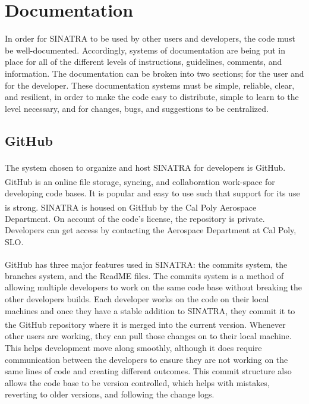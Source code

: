 \section{Documentation}
In order for SINATRA to be used by other users and developers, the code must be well-documented. Accordingly, systems of documentation are being put in place for all of the different levels of instructions, guidelines, comments, and information. The documentation  can be broken into two sections; for the user and for the developer. These documentation systems must be simple, reliable, clear, and resilient, in order to make the code easy to distribute, simple to learn to the level necessary, and for changes, bugs, and suggestions to be centralized.

\subsection{GitHub}
The system chosen to organize and host SINATRA for developers is GitHub\textsuperscript{\textregistered}. GitHub\textsuperscript{\textregistered} is an online file storage, syncing, and collaboration work-space for developing code bases. It is popular and easy to use such that support for its use is strong. SINATRA is housed on GitHub\textsuperscript{\textregistered} by the Cal Poly Aerospace Department. On account of the code's license, the repository is private. Developers can get access by contacting the Aerospace Department at Cal Poly, SLO. \par

\indent GitHub\textsuperscript{\textregistered} has three major features used in SINATRA: the commits system, the branches system, and the ReadME files. The commits system is a method of allowing multiple developers to work on the same code base without breaking the other developers builds. Each developer works on the code on their local machines and once they have a stable addition to SINATRA, they commit it to the GitHub\textsuperscript{\textregistered} repository where it is merged into the current version. Whenever other users are working, they can pull those changes on to their local machine. This helps development move along smoothly, although it does require communication between the developers to ensure they are not working on the same lines of code and creating different outcomes. This commit structure also allows the code base to be version controlled, which helps with mistakes, reverting to older versions, and following the change logs. \par


